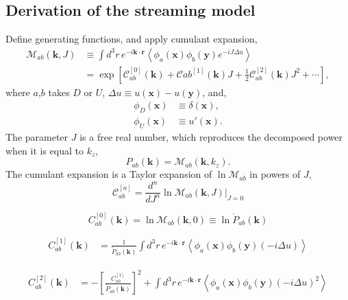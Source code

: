 \documentclass[a4paper,11pt, fleqn]{article}
\begin{document}
\newpage
\subsection{Derivation of the streaming model}


Define generating functions, and apply cumulant expansion,
\begin{align}
  \mathcal{M}_{ab}(\bm{k}, J) &\equiv
  \int \!\! d^3 r \, e^{-i\bm{k}\cdot\bm{r}} \left\langle
  \phi_a(\bm{x}) \phi_b(\bm{y}) e^{-iJ\Delta u} \right\rangle\\
  &= \exp\left[
    \mathcal{C}_{ab}^{[0]}(\bm{k}) +
    \mathcal{C}{ab}^{[1]}(\bm{k}) J +
    \frac{1}{2} \mathcal{C}_{ab}^{[2]}(\bm{k}) J^2 + \cdots
    \right],
\end{align}
where $a$,$b$ takes $D$ or $U$, $\Delta u \equiv u(\bm{x}) - u(\bm{y})$, and,
\begin{align}
  \phi_D(\bm{x}) &\equiv \delta(\bm{x}),\\
  \phi_U(\bm{x}) &\equiv u'(\bm{x}).
\end{align}
The parameter $J$ is a free real number, which reproduces the decomposed power when it is equal to $k_z$,
\begin{equation}
  P_{ab}(\bm{k}) = \mathcal{M}_{ab}(\bm{k}, k_z).
\end{equation}
%
The cumulant expansion is a Taylor expansion of $\ln \mathcal{M}_{ab}$ in powers of $J$,
%
\begin{equation}
  \mathcal{C}_{ab}^{[n]} = \frac{d^n}{dJ^n}
  \ln \mathcal{M}_{ab}(\bm{k}, J) \Big|_{J=0}
\end{equation}

\begin{equation}
  C_{ab}^{[0]}(\bm{k}) =
  \ln \mathcal{M}_{ab}(\bm{k}, 0) \equiv \ln \mathring{P}_{ab}(\bm{k})
\end{equation}

\begin{align}
  C_{ab}^{[1]}(\bm{k}) &= \frac{1}{\mathring{P}_{ab}(\bm{k})}
  \int\!d^3 r \, e^{-i\bm{k}\cdot\bm{r}} \left\langle
  \phi_a(\bm{x}) \phi_b(\bm{y}) (-i \Delta u) \right\rangle
\end{align}

\begin{align}
  C_{ab}^{[2]}(\bm{k}) &=
  - \left[ \frac{C_{ab}^{[1]}}{\mathring{P}_{ab}(\bm{k})} \right]^2
  + \int\!d^3 r \, e^{-i\bm{k}\cdot\bm{r}} \left\langle
  \phi_a(\bm{x}) \phi_b(\bm{y}) (-i \Delta u)^2 \right\rangle
\end{align}
\end{document}
